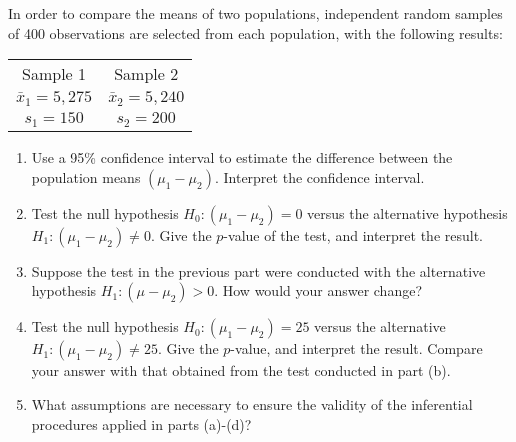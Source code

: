 
\begin{exercise}

In order to compare the means of two populations, independent random samples
of 400 observations are selected from each population, with the following results:

\begin{center}
    \begin{tabular}{c c}
        Sample 1 & Sample 2 \\
        $\bar{x}_1 = 5,275$ & $\bar{x}_2 = 5,240$ \\
        $s_1 = 150$ & $s_2 = 200$ \\
    \end{tabular}
\end{center}

\begin{enumerate}[label = (\alph*)]
    \item Use a 95\% confidence interval to estimate the difference between
    the population means $(\mu_1 - \mu_2)$. Interpret the confidence interval.
    \item Test the null hypothesis $H_0: (\mu_1 - \mu_2) = 0$ versus the
    alternative hypothesis $H_1: (\mu_1 - \mu_2) \neq 0$. Give the $p$-value of the test, and interpret the result.
    \item Suppose the test in the previous part were conducted with the alternative hypothesis 
    $H_1: (\mu - \mu_2) > 0$. How would your answer change?
    \item Test the null hypothesis $H_0: (\mu_1 - \mu_2) = 25$ versus the alternative $H_1: (\mu_1 - \mu_2) \neq 25$.
    Give the $p$-value, and interpret the result. Compare your answer with that
    obtained from the test conducted in part (b).
    \item What assumptions are necessary to ensure the validity of the inferential procedures applied in parts (a)-(d)?
\end{enumerate}

\end{exercise}


\begin{solution}

\phantom{}

\end{solution}

